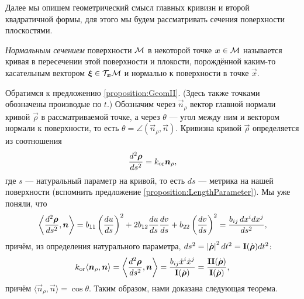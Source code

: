Далее мы опишем геометрический смысл главных кривизн и второй квадратичной формы, для этого мы будем рассматривать сечения поверхности плоскостями. 

\begin{definition}
	\textit{Нормальным сечением} поверхности $\mathcal{M}$ в некоторой точке $\boldsymbol{x} \in \mathcal{M}$ называется кривая в пересечении этой поверхности и плокости, порождённой каким-то касательным вектором $\boldsymbol{\xi} \in \mathcal{T}_{\boldsymbol{x}}\mathcal{M}$ и нормалью к поверхности в точке $\vec{x}$.
\end{definition}

%

Обратимся к предложению \ref{proposition:GeomII}. (Здесь также точками обозначены производые по $t$.) Обозначим через $\vec{n}_\rho$ вектор главной нормали кривой $\vec{\rho}$ в рассматриваемой точке, а через $\theta$ --- угол между ним и вектором нормали к поверхности, то есть $\theta = \angle(\vec{n}_\rho, \vec{n})$. Кривизна\footnotemark{} кривой $\vec{\rho}$ определяется из соотношения
\[
	\frac{d^2\boldsymbol{\rho}}{ds^2} = k_{\mathrm{or}}\boldsymbol{n}_\rho,
\]
где $s$ --- натуральный параметр на кривой, то есть $ds$ --- метрика на нашей поверхности (вспомнить предложение \ref{proposition:LengthParameter}). Мы уже поняли, что
\[
	\left\langle\frac{d^2\boldsymbol{\rho}}{ds^2}, \boldsymbol{n}\right\rangle = b_{11}\left(\frac{du}{ds}\right)^2 + 2b_{12}\frac{du}{ds}\frac{dv}{ds} + b_{22}\left(\frac{dv}{ds}\right)^2 = \frac{b_{ij}\,dx^idx^j}{ds^2},
\]
причём, из определения натурального параметра, $ds^2 = \left\lvert\dot{\boldsymbol{\rho}}\right\rvert^2dt^2 = \boldsymbol{\operatorname{I}}(\dot{\boldsymbol{\rho}})dt^2$:
\[
	k_{\mathrm{or}}\langle\boldsymbol{n}_\rho, \boldsymbol{n}\rangle = \left\langle\frac{d^2\boldsymbol{\rho}}{ds^2}, \boldsymbol{n}\right\rangle = \frac{b_{ij}\dot{x}^i\dot{x}^j}{\boldsymbol{\operatorname{I}}(\dot{\boldsymbol{\rho}})} = \frac{\boldsymbol{\operatorname{II}}(\dot{\boldsymbol{\rho}})}{\boldsymbol{\operatorname{I}}(\dot{\boldsymbol{\rho}})},
\]
причём $\langle\vec{n}_\rho, \vec{n}\rangle = \cos\theta$. Таким образом, нами доказана следующая теорема.

